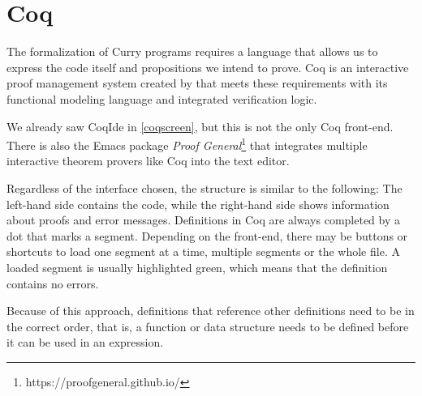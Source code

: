 \documentclass[paper = a4, fleqn, twoside]{scrreprt}
\begin{document}
\section{Coq}
The formalization of Curry programs requires a language that allows us to express the code itself and propositions we intend to prove. Coq is an interactive proof management system created by \cite{CoqManualV8} that meets these requirements with its functional modeling language and integrated verification logic.
\par
We already saw CoqIde in \autoref{coqscreen}, but this is not the only Coq front-end. There is also the Emacs package \textit{Proof General}\footnote{https://proofgeneral.github.io/} that integrates multiple interactive theorem provers like Coq into the text editor.
\par 
Regardless of the interface chosen, the structure is similar to the following: The left-hand side contains the code, while the right-hand side shows information about proofs and error messages. Definitions in Coq are always completed by a dot that marks a segment. Depending on the front-end, there may be buttons or shortcuts to load one segment at a time, multiple segments or the whole file. A loaded segment is usually highlighted green, which means that the definition contains no errors.
\par
Because of this approach, definitions that reference other definitions need to be in the correct order, that is, a function or data structure needs to be defined before it can be used in an expression.
\end{document}
